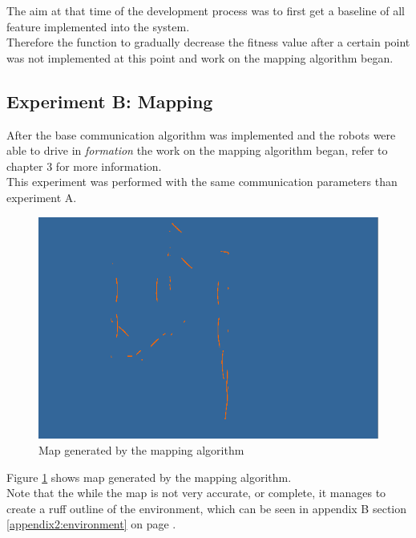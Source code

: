 The aim at that time of the development process was to first get a baseline of all feature implemented into the system.\\
Therefore the function to gradually decrease the fitness value after a certain point was not implemented at this point and work on the mapping algorithm began.

\subsection{Experiment B: Mapping}
After the base  communication algorithm was implemented and the robots were able to drive in \textit{formation} the work on the mapping algorithm began, refer to chapter 3 for more information. \\

This experiment was performed with the same communication parameters than experiment A. \\

\begin{figure}[h]
\centering
\includegraphics[scale=0.5]{Chapter4/images/map1.png}
\caption{Map generated by the mapping algorithm}
\label{fig:map1}
\end{figure}

Figure \ref{fig:map1} shows map generated by the mapping algorithm.\\
Note that the while the map is not very accurate, or complete, it manages to create a ruff outline of the environment, which can be seen in appendix B section \ref{appendix2:environment} on page \pageref{appendix2:environment}. \\

